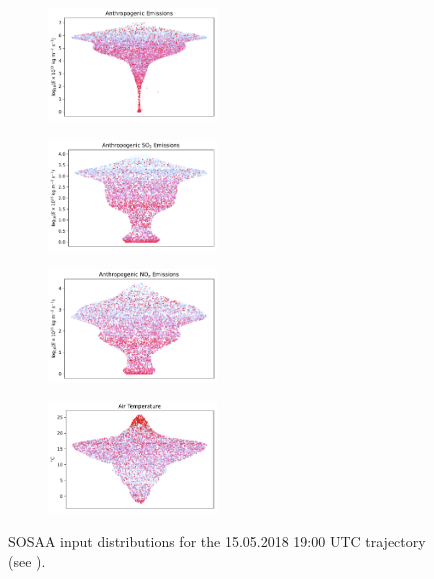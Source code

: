 \begin{figure}[H]
    \begin{subfigure}
        \centering
        \includegraphics[width=0.49\textwidth,valign=t]{sosaa-data/figures/trajectories/trajectory-15.05.2018:19.00-anthropogenic.pdf}
    \end{subfigure}
    \begin{subfigure}
        \centering
        \includegraphics[width=0.49\textwidth,valign=t]{sosaa-data/figures/trajectories/trajectory-15.05.2018:19.00-so2.pdf}
    \end{subfigure}

    \begin{subfigure}
        \centering
        \includegraphics[width=0.49\textwidth,valign=t]{sosaa-data/figures/trajectories/trajectory-15.05.2018:19.00-nox.pdf}
    \end{subfigure}
    \begin{subfigure}
        \centering
        \includegraphics[width=0.49\textwidth,valign=t]{sosaa-data/figures/trajectories/trajectory-15.05.2018:19.00-temperature.pdf}
    \end{subfigure}

    \caption[Inputs for the 15.05.2018 19:00 UTC Trajectory]{SOSAA input distributions for the 15.05.2018 19:00 UTC trajectory (see ).}
    \label{fig:trajectory-inputs-15-05}
\end{figure}

